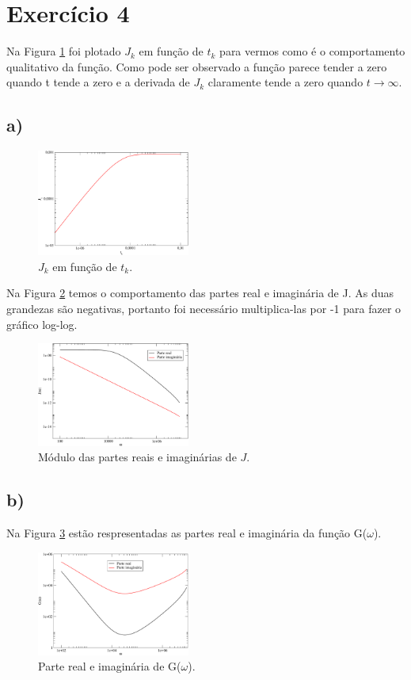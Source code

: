 \documentclass[a4wide]{report}
\begin{document}
\section*{Exercício 4}

Na Figura \ref{jk} foi plotado $J_k$ em função de $t_k$ para vermos como é o comportamento qualitativo da função. Como pode ser observado a função parece tender a zero quando t tende a zero e a derivada de $J_k$ claramente tende a zero quando $t\rightarrow \infty$.
\subsection*{a)}
\begin{figure}[!htb]
\centering
\includegraphics[width=0.447\textwidth]{jk.pdf}
\caption{ $J_k$ em função de $t_k$.}
\label{jk}
\end{figure}

Na Figura \ref{j} temos o comportamento das partes real e imaginária de J. As duas grandezas são negativas, portanto foi necessário multiplica-las por -1 para fazer o gráfico log-log.

\begin{figure}[!htb]
\centering
\includegraphics[width=0.447\textwidth]{J.pdf}
\caption{ Módulo das partes reais e imaginárias de $J$.}
\label{j}
\end{figure}


\subsection*{b)}
Na Figura \ref{g} estão respresentadas as partes real e imaginária da função G($\omega$).

\begin{figure}[!htb]
\centering
\includegraphics[width=0.447\textwidth]{g.pdf}
\caption{ Parte real e imaginária de G($\omega$).}
\label{g}
\end{figure}
\end{document}
